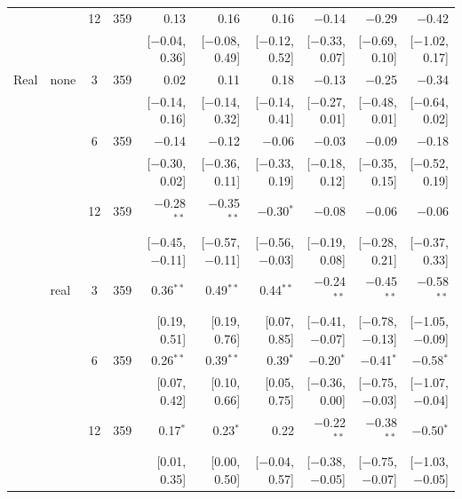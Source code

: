 \begin{longtable}{llcrrrrrrr}
 &  & 12 & 359 & 0.13 & 0.16 & 0.16 & $-$0.14 & $-$0.29 & $-$0.42\\
 & & & & {\scriptsize [$-$0.04, 0.36]} & {\scriptsize [$-$0.08, 0.49]} & {\scriptsize [$-$0.12, 0.52]} & {\scriptsize [$-$0.33, 0.07]} & {\scriptsize [$-$0.69, 0.10]} & {\scriptsize [$-$1.02, 0.17]}\\
\addlinespace
Real & none & 3 & 359 & 0.02 & 0.11 & 0.18 & $-$0.13 & $-$0.25 & $-$0.34\\
 & & & & {\scriptsize [$-$0.14, 0.16]} & {\scriptsize [$-$0.14, 0.32]} & {\scriptsize [$-$0.14, 0.41]} & {\scriptsize [$-$0.27, 0.01]} & {\scriptsize [$-$0.48, 0.01]} & {\scriptsize [$-$0.64, 0.02]}\\
 &  & 6 & 359 & $-$0.14 & $-$0.12 & $-$0.06 & $-$0.03 & $-$0.09 & $-$0.18\\
 & & & & {\scriptsize [$-$0.30, 0.02]} & {\scriptsize [$-$0.36, 0.11]} & {\scriptsize [$-$0.33, 0.19]} & {\scriptsize [$-$0.18, 0.12]} & {\scriptsize [$-$0.35, 0.15]} & {\scriptsize [$-$0.52, 0.19]}\\
 &  & 12 & 359 & $-$0.28$^{**}$ & $-$0.35$^{**}$ & $-$0.30$^{*}$ & $-$0.08 & $-$0.06 & $-$0.06\\
 & & & & {\scriptsize [$-$0.45, $-$0.11]} & {\scriptsize [$-$0.57, $-$0.11]} & {\scriptsize [$-$0.56, $-$0.03]} & {\scriptsize [$-$0.19, 0.08]} & {\scriptsize [$-$0.28, 0.21]} & {\scriptsize [$-$0.37, 0.33]}\\
 & real & 3 & 359 & 0.36$^{**}$ & 0.49$^{**}$ & 0.44$^{**}$ & $-$0.24$^{**}$ & $-$0.45$^{**}$ & $-$0.58$^{**}$\\
 & & & & {\scriptsize [0.19, 0.51]} & {\scriptsize [0.19, 0.76]} & {\scriptsize [0.07, 0.85]} & {\scriptsize [$-$0.41, $-$0.07]} & {\scriptsize [$-$0.78, $-$0.13]} & {\scriptsize [$-$1.05, $-$0.09]}\\
 &  & 6 & 359 & 0.26$^{**}$ & 0.39$^{**}$ & 0.39$^{*}$ & $-$0.20$^{*}$ & $-$0.41$^{*}$ & $-$0.58$^{*}$\\
 & & & & {\scriptsize [0.07, 0.42]} & {\scriptsize [0.10, 0.66]} & {\scriptsize [0.05, 0.75]} & {\scriptsize [$-$0.36, 0.00]} & {\scriptsize [$-$0.75, $-$0.03]} & {\scriptsize [$-$1.07, $-$0.04]}\\
 &  & 12 & 359 & 0.17$^{*}$ & 0.23$^{*}$ & 0.22 & $-$0.22$^{**}$ & $-$0.38$^{**}$ & $-$0.50$^{*}$\\
 & & & & {\scriptsize [0.01, 0.35]} & {\scriptsize [0.00, 0.50]} & {\scriptsize [$-$0.04, 0.57]} & {\scriptsize [$-$0.38, $-$0.05]} & {\scriptsize [$-$0.75, $-$0.07]} & {\scriptsize [$-$1.03, $-$0.05]}\\

\end{longtable}

